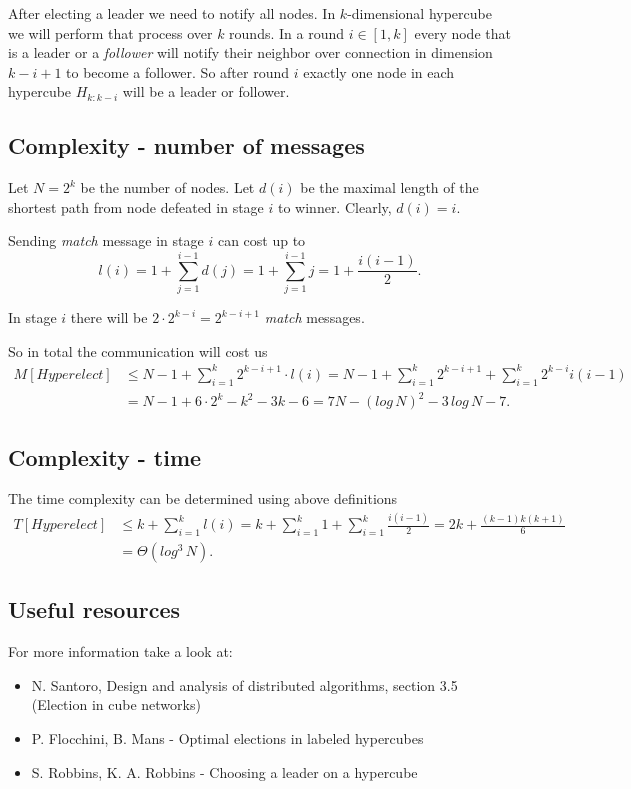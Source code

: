 \documentclass[11pt]{article}
\begin{document}
After electing a leader we need to notify all nodes. In $k$-dimensional hypercube we will perform that process over $k$ rounds. In a round $i\in[1, k]$ every node that is a leader or a \textit{follower} will notify their neighbor over connection in dimension $k-i+1$ to become a follower. So after round $i$ exactly one node in each hypercube $H_{k:k-i}$ will be a leader or follower.

\subsection*{Complexity - number of messages}

Let $N = 2^{k}$ be the number of nodes. Let $d(i)$ be the maximal length of the shortest path from node defeated in stage $i$ to winner. Clearly, $d(i) = i$.

Sending \textit{match} message in stage $i$ can cost up to 
$$l(i) = 1 + \sum_{j=1}^{i-1}d(j) = 1 + \sum_{j=1}^{i-1}j = 1 + \frac{i(i-1)}{2}.$$

In stage $i$ there will be $2\cdot 2^{k-i} = 2^{k-i+1}$ \textit{match} messages.

So in total the communication will cost us
\begin{align*}
    M[Hyperelect] &\leq N-1 + \sum_{i=1}^{k}2^{k-i+1}\cdot l(i) 
    = N-1 + \sum_{i=1}^{k}2^{k-i+1} + \sum_{i=1}^{k}2^{k-i}i(i-1)\\
    &= N-1 + 6\cdot 2^{k}-k^{2}-3k-6 = 7N - (log\,N)^{2} - 3\,log\,N-7.
\end{align*}

\subsection*{Complexity - time}

The time complexity can be determined using above definitions
\begin{align*}
    T[Hyperelect] &\leq k + \sum_{i=1}^{k}l(i) 
    = k + \sum_{i=1}^{k}1+\sum_{i=1}^{k}\frac{i(i-1)}{2} 
    = 2k + \frac{(k-1)k(k+1)}{6} \\
    &= \Theta(log^{3}\,N).
\end{align*}

\subsection*{Useful resources}
For more information take a look at:
\begin{itemize}
    \item N. Santoro, Design and analysis of distributed algorithms, section 3.5 (Election in cube networks)
    \item P. Flocchini, B. Mans - Optimal elections in labeled hypercubes
    \item S. Robbins, K. A. Robbins - Choosing a leader on a hypercube
\end{itemize}
\end{document}
